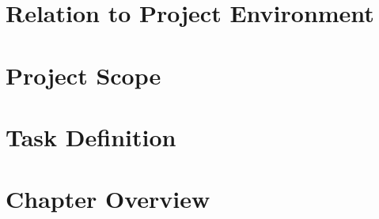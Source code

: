 
	
	\label{sec:1-motivation}
	
\section{Relation to Project Environment}
	
	\label{sec:1-relation}
	
\section{Project Scope}
	
	\label{sec:1-scope}
	
\section{Task Definition}
	
	\label{sec:1-task}
	
\section{Chapter Overview}
	
	\label{sec:1-chapters}